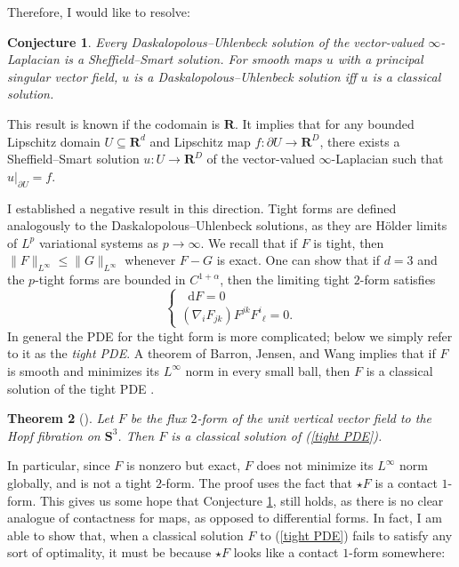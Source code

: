 \documentclass[reqno,11pt]{amsart}
\newcommand{\RR}{\mathbf{R}}
\newcommand{\Sph}{\mathbf S}
\newcommand*\dif{\mathop{}\!\mathrm{d}}
\newcommand{\dfn}[1]{\emph{#1}\index{#1}}
\newtheorem{theorem}{Theorem}[section]
\newtheorem{conjecture}[theorem]{Conjecture}
\theoremstyle{definition}
\numberwithin{equation}{section}
\begin{document}
Therefore, I would like to resolve:

\begin{conjecture}\label{infinity laplacian conjecture}
Every Daskalopolous--Uhlenbeck solution of the vector-valued $\infty$-Laplacian is a Sheffield--Smart solution.
For smooth maps $u$ with a principal singular vector field, $u$ is a Daskalopolous--Uhlenbeck solution iff $u$ is a classical solution.
\end{conjecture}

This result is known if the codomain is $\RR$.
It implies that for any bounded Lipschitz domain $U \subseteq \RR^d$ and Lipschitz map $f: \partial U \to \RR^D$, there exists a Sheffield--Smart solution $u: U \to \RR^D$ of the vector-valued $\infty$-Laplacian such that $u|_{\partial U} = f$.

I established a negative result in this direction.
Tight forms are defined analogously to the Daskalopolous--Uhlenbeck solutions, as they are H\"older limits of $L^p$ variational systems as $p \to \infty$.
We recall that if $F$ is tight, then $\|F\|_{L^\infty} \leq \|G\|_{L^\infty}$ whenever $F - G$ is exact.
One can show that if $d = 3$ and the $p$-tight forms are bounded in $C^{1 + \alpha}$, then the limiting tight $2$-form satisfies 
\begin{equation}\label{tight PDE}
\begin{cases}
\dif F = 0 \\
(\nabla_i F_{jk}) F^{jk} {F^i}_\ell = 0.
\end{cases}
\end{equation}
In general the PDE for the tight form is more complicated; below we simply refer to it as the \dfn{tight PDE}.
A theorem of Barron, Jensen, and Wang implies that if $F$ is smooth and minimizes its $L^\infty$ norm in every small ball, then $F$ is a classical solution of the tight PDE \cite{Barron2001}.

\begin{theorem}[{\cite{BackusCML1}}]
Let $F$ be the flux $2$-form of the unit vertical vector field to the Hopf fibration on $\Sph^3$.
Then $F$ is a classical solution of (\ref{tight PDE}).
\end{theorem}

In particular, since $F$ is nonzero but exact, $F$ does not minimize its $L^\infty$ norm globally, and is not a tight $2$-form.
The proof uses the fact that $\star F$ is a contact $1$-form.
This gives us some hope that Conjecture \ref{infinity laplacian conjecture}, still holds, as there is no clear analogue of contactness for maps, as opposed to differential forms.
In fact, I am able to show that, when a classical solution $F$ to (\ref{tight PDE}) fails to satisfy any sort of optimality, it must be because $\star F$ looks like a contact $1$-form somewhere:
\end{document}
